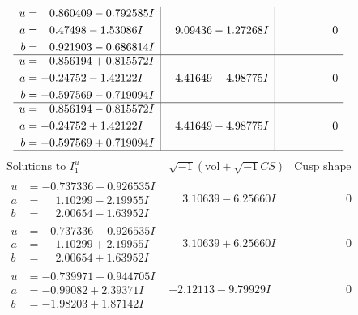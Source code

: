\documentclass[1p]{elsarticle_modified}
\theoremstyle{definition}
\newcommand{\I}{\sqrt{-1}}
\begin{document}
$$\begin{array}{c|c|c}
\begin{aligned}
u &= \phantom{-}0.860409 - 0.792585 I \\
a &= \phantom{-}0.47498 - 1.53086 I \\
b &= \phantom{-}0.921903 - 0.686814 I\end{aligned}
 & \phantom{-}9.09436 - 1.27268 I & \phantom{-0.000000 } 0 \\ \hline\begin{aligned}
u &= \phantom{-}0.856194 + 0.815572 I \\
a &= -0.24752 - 1.42122 I \\
b &= -0.597569 - 0.719094 I\end{aligned}
 & \phantom{-}4.41649 + 4.98775 I & \phantom{-0.000000 } 0 \\ \hline\begin{aligned}
u &= \phantom{-}0.856194 - 0.815572 I \\
a &= -0.24752 + 1.42122 I \\
b &= -0.597569 + 0.719094 I\end{aligned}
 & \phantom{-}4.41649 - 4.98775 I & \phantom{-0.000000 } 0\\
 \hline 
 \end{array}$$\newpage$$\begin{array}{c|c|c}  
\text{Solutions to }I^u_{1}& \I (\text{vol} + \sqrt{-1}CS) & \text{Cusp shape}\\
 \hline 
\begin{aligned}
u &= -0.737336 + 0.926535 I \\
a &= \phantom{-}1.10299 - 2.19955 I \\
b &= \phantom{-}2.00654 - 1.63952 I\end{aligned}
 & \phantom{-}3.10639 - 6.25660 I & \phantom{-0.000000 } 0 \\ \hline\begin{aligned}
u &= -0.737336 - 0.926535 I \\
a &= \phantom{-}1.10299 + 2.19955 I \\
b &= \phantom{-}2.00654 + 1.63952 I\end{aligned}
 & \phantom{-}3.10639 + 6.25660 I & \phantom{-0.000000 } 0 \\ \hline\begin{aligned}
u &= -0.739971 + 0.944705 I \\
a &= -0.99082 + 2.39371 I \\
b &= -1.98203 + 1.87142 I\end{aligned}
 & -2.12113 - 9.79929 I & \phantom{-0.000000 } 0 \\ \hline\begin{aligned}

\end{aligned}
\end{array}$$
\end{document}
